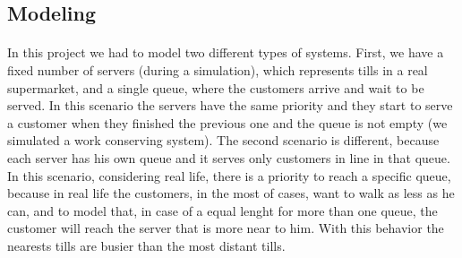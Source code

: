 \subsection{Modeling}
\paragraph{} 
In this project we had to model two different types of systems. First, we have a fixed number of servers (during a simulation), which represents tills in a real supermarket, and a single queue, where the customers arrive and wait to be served. In this scenario the servers have the same priority and they start to serve a customer when they finished the previous one and the queue is not empty (we simulated a work conserving system). The second scenario is different, because each server has his own queue and it serves only customers in line in that queue. In this scenario, considering real life, there is a priority to reach a specific queue, because in real life the customers, in the most of cases, want to walk as less as he can, and to model that, in case of a equal lenght for more than one queue, the customer will reach the server that is more near to him. With this behavior the nearests tills are busier than the most distant tills. 